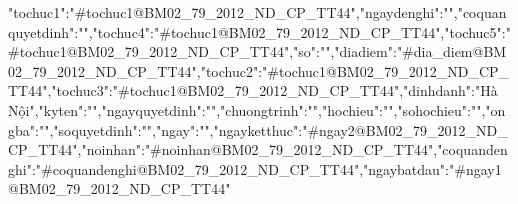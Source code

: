 {"tochuc1":"#tochuc1@BM02_79_2012_ND_CP_TT44","ngaydenghi":"","coquanquyetdinh":"","tochuc4":"#tochuc1@BM02_79_2012_ND_CP_TT44","tochuc5":"#tochuc1@BM02_79_2012_ND_CP_TT44","so":"","diadiem":"#dia_diem@BM02_79_2012_ND_CP_TT44","tochuc2":"#tochuc1@BM02_79_2012_ND_CP_TT44","tochuc3":"#tochuc1@BM02_79_2012_ND_CP_TT44","dinhdanh":"Hà Nội","kyten":"","ngayquyetdinh":"","chuongtrinh":"","hochieu":"","sohochieu":"","ongba":"","soquyetdinh":"","ngay":"","ngayketthuc":"#ngay2@BM02_79_2012_ND_CP_TT44","noinhan":"#noinhan@BM02_79_2012_ND_CP_TT44","coquandenghi":"#coquandenghi@BM02_79_2012_ND_CP_TT44","ngaybatdau":"#ngay1@BM02_79_2012_ND_CP_TT44"}